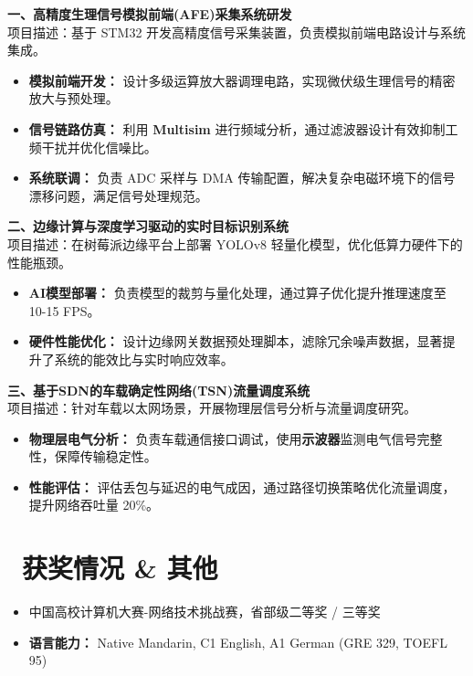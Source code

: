 \documentclass[11pt]{article}
\newlength{\interProjectSpacing}
\newcommand{\projectsep}{\vspace{\interProjectSpacing}}
\newlength{\intraProjectTitleSep}
\newcommand{\titlebreak}{\\[\intraProjectTitleSep]}
\newlength{\intraProjectListTopSep}
\begin{document}
\textbf{一、高精度生理信号模拟前端(AFE)采集系统研发} \hfill \titlebreak
项目描述：基于 STM32 开发高精度信号采集装置，负责模拟前端电路设计与系统集成。
\begin{itemize}[topsep=\intraProjectListTopSep]
    \item \textbf{模拟前端开发：} 设计多级运算放大器调理电路，实现微伏级生理信号的精密放大与预处理。
    \item \textbf{信号链路仿真：} 利用 \textbf{Multisim} 进行频域分析，通过滤波器设计有效抑制工频干扰并优化信噪比。
    \item \textbf{系统联调：} 负责 ADC 采样与 DMA 传输配置，解决复杂电磁环境下的信号漂移问题，满足信号处理规范。
\end{itemize}

\projectsep

\textbf{二、边缘计算与深度学习驱动的实时目标识别系统} \hfill \titlebreak
项目描述：在树莓派边缘平台上部署 YOLOv8 轻量化模型，优化低算力硬件下的性能瓶颈。
\begin{itemize}[topsep=\intraProjectListTopSep]
    \item \textbf{AI模型部署：} 负责模型的裁剪与量化处理，通过算子优化提升推理速度至 10-15 FPS。
    \item \textbf{硬件性能优化：} 设计边缘网关数据预处理脚本，滤除冗余噪声数据，显著提升了系统的能效比与实时响应效率。
\end{itemize}

\projectsep

\textbf{三、基于SDN的车载确定性网络(TSN)流量调度系统} \hfill \titlebreak
项目描述：针对车载以太网场景，开展物理层信号分析与流量调度研究。
\begin{itemize}[topsep=\intraProjectListTopSep]
    \item \textbf{物理层电气分析：} 负责车载通信接口调试，使用\textbf{示波器}监测电气信号完整性，保障传输稳定性。
    \item \textbf{性能评估：} 评估丢包与延迟的电气成因，通过路径切换策略优化流量调度，提升网络吞吐量 20\%。
\end{itemize}

\section{\makebox[\widthof{\faList}][c]{\color{CVBlue}\faList}\ 获奖情况 \& 其他}
\begin{itemize}
    \item 中国高校计算机大赛-网络技术挑战赛，省部级二等奖 / 三等奖
    \item \textbf{语言能力：} Native Mandarin, C1 English, A1 German (GRE 329, TOEFL 95)
\end{itemize}
\end{document}
